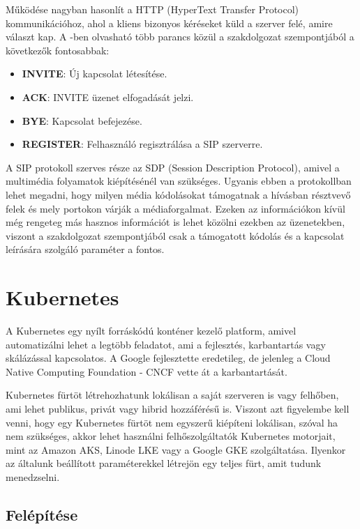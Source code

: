Működése nagyban hasonlít a HTTP (HyperText Transfer Protocol) kommunikációhoz, ahol 
a kliens bizonyos kéréseket küld a szerver felé, amire választ kap. A \cite{RFC3261}-ben
olvasható több parancs közül a szakdolgozat szempontjából a következők fontosabbak: 

\begin{itemize}
	\item \textbf{INVITE}: Új kapcsolat létesítése.
	\item \textbf{ACK}: INVITE üzenet elfogadását jelzi. 
	\item \textbf{BYE}: Kapcsolat befejezése. 
	\item \textbf{REGISTER}: Felhasználó regisztrálása a SIP szerverre. 
\end{itemize}

A SIP protokoll szerves része az SDP (Session Description Protocol), amivel a multimédia
folyamatok kiépítésénél van szükséges. Ugyanis ebben a protokollban lehet megadni,
hogy milyen média kódolásokat támogatnak a hívásban résztvevő felek és mely
portokon várják a médiaforgalmat. Ezeken az információkon kívül még rengeteg 
más hasznos információt is lehet közölni ezekben az üzenetekben, viszont a 
szakdolgozat szempontjából csak a támogatott kódolás és a kapcsolat leírására
szolgáló paraméter a fontos.

\section{Kubernetes}

A Kubernetes egy nyílt forráskódú konténer kezelő platform, amivel automatizálni
lehet a legtöbb feladatot, ami a fejlesztés, karbantartás vagy skálázással 
kapcsolatos. A Google fejlesztette eredetileg, de jelenleg a Cloud Native
Computing Foundation - CNCF vette át a karbantartását. 

Kubernetes fürtöt létrehozhatunk lokálisan a saját szerveren is vagy felhőben,
ami lehet publikus, privát vagy hibrid hozzáférésű is. Viszont azt figyelembe 
kell venni, hogy egy Kubernetes fürtöt nem egyszerű kiépíteni lokálisan, 
szóval ha nem szükséges, akkor lehet használni felhőszolgáltatók Kubernetes 
motorjait, mint az Amazon AKS, Linode LKE vagy a Google GKE szolgáltatása.
Ilyenkor az általunk beállított paraméterekkel létrejön egy teljes fürt, amit
tudunk menedzselni.

\subsection{Felépítése}

